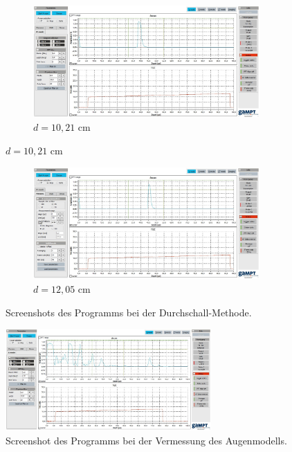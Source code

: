 \begin{figure}
  \begin{subfigure}{0.7\textwidth}
    \centering
    \includegraphics[width=0.95\textwidth]{screens/d1021.jpg}
    \caption{$d = 10,21$ cm}
    \label{fig:135-deg}
  \end{subfigure}

  \label{fig: graphen}
\end{figure}

\begin{figure}
  \centering

  \begin{subfigure}{0.7\textwidth}
    \centering
    \includegraphics[width=0.95\textwidth]{screens/d1205.jpg}
    \caption{$d = 12,05$ cm}
    \label{fig:180-deg}
  \end{subfigure}
  \caption{Screenshots des Programms bei der Durchschall-Methode.}
  \label{fig:durchgraphen}
\end{figure}

\begin{figure}
    \centering
    \includegraphics[width=0.7\textwidth]{screens/auge.jpg}
    \caption{Screenshot des Programms bei der Vermessung des Augenmodells.}
    \label{fig:screenauge}
\end{figure}